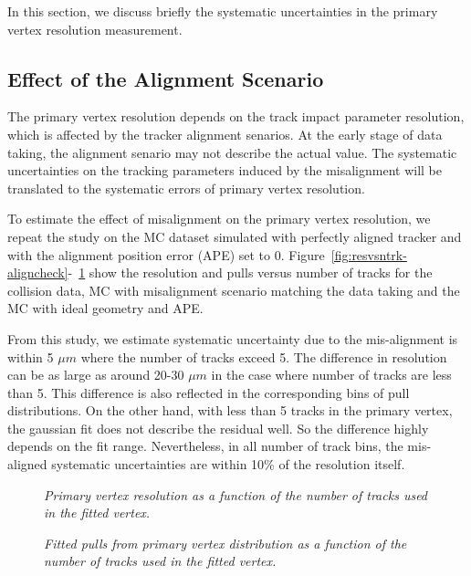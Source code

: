 In this section, we discuss briefly the systematic uncertainties in 
the primary vertex resolution measurement. 

\subsection{Effect of the Alignment Scenario}

The primary vertex resolution depends on the track impact parameter resolution,
which is affected by the tracker alignment senarios. 
At the early stage of data taking, the alignment senario may 
not describe the actual value. 
The systematic uncertainties on the tracking parameters induced 
by the misalignment will be translated to the systematic errors 
of primary vertex resolution. 

To estimate the effect of misalignment on the primary vertex resolution, 
we repeat the study on the MC dataset simulated with perfectly 
aligned tracker and with the alignment position error (APE) set to 0. 
Figure~\ref{fig:resvsntrk-aligncheck}-~\ref{fig:pullvsntrk-aligncheck} 
show the resolution and pulls versus number of tracks for the collision data, 
MC with misalignment scenario matching the data taking and the MC with 
ideal geometry and APE.

From this study, we estimate systematic uncertainty due to the mis-alignment 
is within 5 $\mu m$ where the number of tracks exceed 5. 
The difference in resolution can be as large as around 20-30 $\mu m$ 
in the case where number of tracks are less than 5. 
This difference is also reflected in the corresponding bins of 
pull distributions. On the other hand, with less than 5 tracks in the 
primary vertex, the gaussian fit does not describe the residual well. 
So the difference highly depends on the fit range. 
Nevertheless, in all number of track bins, the mis-aligned systematic 
uncertainties are within 10\% of the resolution itself. 

\begin{figure}[htb]
\begin{center}
\centerline{
}
\caption{\sl
Primary vertex resolution as a function of the number of tracks used in the 
fitted vertex.
}
\label{fig:resvsntrk-aligncheck}
\end{center}
\begin{center}
\centerline{
}
\caption{\sl
Fitted pulls from primary vertex distribution as a function of the number of tracks used in the 
fitted vertex.}
\label{fig:pullvsntrk-aligncheck}
\end{center}
\end{figure}



